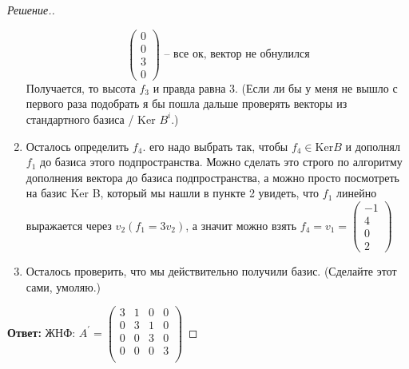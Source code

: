 \documentclass[a4paper]{article}
\theoremstyle{remark}
\begin{document}
\begin{proof}[Решение.]
\begin{enumerate}
$$\begin{pmatrix}
                    0\\
                    0\\
                    3\\
                    0
                \end{pmatrix}
                \text{  -- все ок, вектор не обнулился}
                $$ 
                Получается, то высота $f_3$ и правда равна 3. (Если 
                ли бы у меня не вышло с первого раза подобрать я бы пошла 
                дальше проверять векторы из стандартного базиса / Ker $B^i$.)
                \item Осталось определить $f_4$. его надо выбрать так, чтобы $f_4 \in \text{Ker} B$ 
                и дополнял $f_1$ до базиса этого подпространства. 
                Можно сделать это строго по алгоритму дополнения вектора до базиса подпространства, 
                а можно просто посмотреть на базис Ker B, который мы нашли в пункте 2 увидеть, что 
                $f_1$ линейно выражается через $v_2 (f_1= 3v_2)$, а значит можно взять $f_4 = v_1 = 
                \begin{pmatrix}
                    -1\\
                    4\\
                    0\\
                    2
                \end{pmatrix}$
                \item Осталось проверить, что мы действительно получили базис. 
                (Сделайте этот сами, умоляю.)
            \end{enumerate}

            \textbf{Ответ:} ЖНФ: $A^\prime = 
            \begin{pmatrix}
                3 & 1 & 0 & 0 \\
                0 & 3 & 1 & 0 \\
                0 & 0 & 3 & 0 \\
                0 & 0 & 0 & 3 \\
            \end{pmatrix}$


\end{proof}
\end{document}
